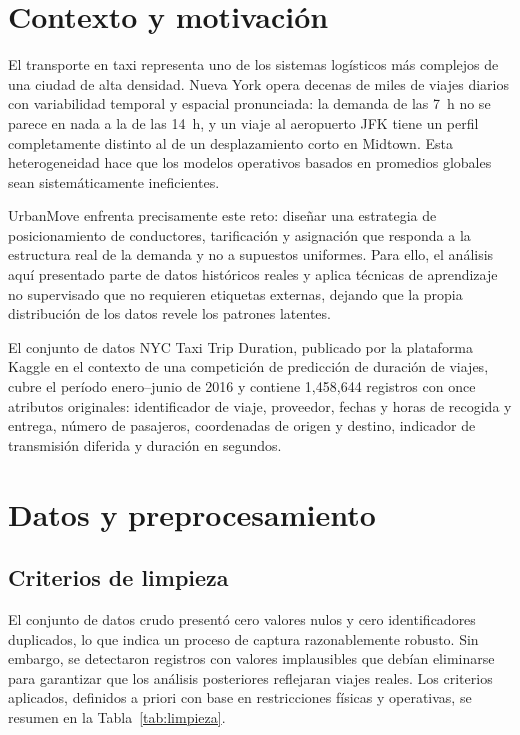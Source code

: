 \documentclass[12pt, a4paper]{article}
\begin{document}
\tableofcontents
\newpage

\section{Contexto y motivación}

El transporte en taxi representa uno de los sistemas logísticos más complejos de una ciudad de alta densidad. Nueva York opera decenas de miles de viajes diarios con variabilidad temporal y espacial pronunciada: la demanda de las 7~h no se parece en nada a la de las 14~h, y un viaje al aeropuerto JFK tiene un perfil completamente distinto al de un desplazamiento corto en Midtown. Esta heterogeneidad hace que los modelos operativos basados en promedios globales sean sistemáticamente ineficientes.

UrbanMove enfrenta precisamente este reto: diseñar una estrategia de posicionamiento de conductores, tarificación y asignación que responda a la estructura real de la demanda y no a supuestos uniformes. Para ello, el análisis aquí presentado parte de datos históricos reales y aplica técnicas de aprendizaje no supervisado que no requieren etiquetas externas, dejando que la propia distribución de los datos revele los patrones latentes.

El conjunto de datos NYC Taxi Trip Duration, publicado por la plataforma Kaggle en el contexto de una competición de predicción de duración de viajes, cubre el período enero--junio de 2016 y contiene 1{,}458{,}644 registros con once atributos originales: identificador de viaje, proveedor, fechas y horas de recogida y entrega, número de pasajeros, coordenadas de origen y destino, indicador de transmisión diferida y duración en segundos.

\section{Datos y preprocesamiento}
\label{sec:datos}

\subsection{Criterios de limpieza}

El conjunto de datos crudo presentó cero valores nulos y cero identificadores duplicados, lo que indica un proceso de captura razonablemente robusto. Sin embargo, se detectaron registros con valores implausibles que debían eliminarse para garantizar que los análisis posteriores reflejaran viajes reales. Los criterios aplicados, definidos a priori con base en restricciones físicas y operativas, se resumen en la Tabla~\ref{tab:limpieza}.
\end{document}

